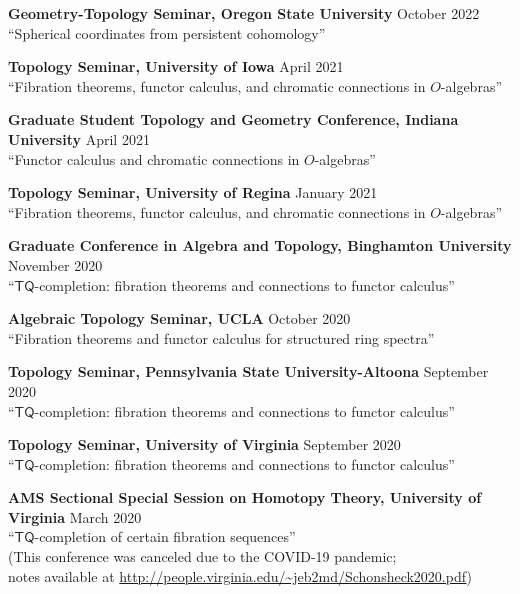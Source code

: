 \documentclass[10pt,letterpaper]{article}
\renewenvironment{itemize}{
  \begin{list}{}{
    \setlength{\leftmargin}{1.5em}
    \setlength{\itemsep}{0.25em}
    \setlength{\parskip}{0pt}
    \setlength{\parsep}{0.25em}
  }
}{
  \end{list}
}
\begin{document}
\begin{itemize}
\item {\bf Geometry-Topology Seminar, Oregon State University} \hfill October 2022\\
``Spherical coordinates from persistent cohomology''



\item {\bf Topology Seminar, University of Iowa} \hfill April 2021\\
``Fibration theorems, functor calculus, and chromatic connections in $O$-algebras''


\item{\bf Graduate Student Topology and Geometry Conference, Indiana University} \hfill April 2021\\
``Functor calculus and chromatic connections in $O$-algebras''

\item {\bf Topology Seminar, University of Regina} \hfill January 2021\\
``Fibration theorems, functor calculus, and chromatic connections in $O$-algebras''

\item {\bf Graduate Conference in Algebra and Topology, Binghamton University} \hfill November 2020\\
``$\mathsf{TQ}$-completion: fibration theorems and connections to functor calculus''

\item {\bf Algebraic Topology Seminar, UCLA} \hfill October 2020\\
``Fibration theorems and functor calculus for structured ring spectra''

\item{\bf Topology Seminar, Pennsylvania State University-Altoona} \hfill September 2020\\
``$\mathsf{TQ}$-completion: fibration theorems and connections to functor calculus''


\item{\bf Topology Seminar, University of Virginia} \hfill September 2020\\
``$\mathsf{TQ}$-completion: fibration theorems and connections to functor calculus''
	
	
\item {\bf AMS Sectional Special Session on Homotopy Theory, University of Virginia} \hfill March 2020\\
``$\mathsf{TQ}$-completion of certain fibration sequences''\\
(This conference was canceled due to the COVID-19 pandemic; \\notes available at \url{http://people.virginia.edu/~jeb2md/Schonsheck2020.pdf})


\end{itemize}
\end{document}
